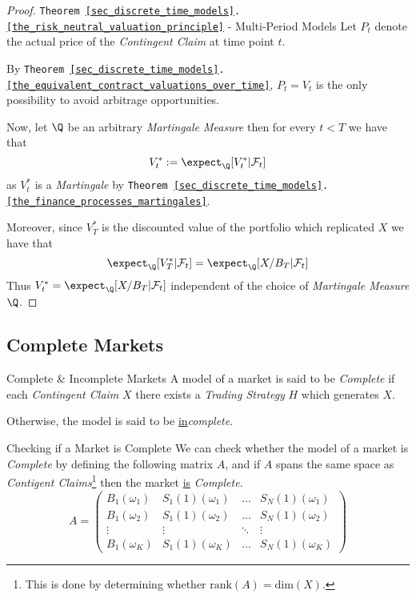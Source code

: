 \documentclass[11pt,a4paper]{article}
\begin{document}
  \begin{proof}{\texttt{Theorem \ref{sec_discrete_time_models}.\ref{the_risk_neutral_valuation_principle}} - Multi-Period Models}\label{prf_risk_neutral_valuation_principle_multi_period}
    Let $P_t$ denote the actual price of the \textit{Contingent Claim} at time point $t$.
    \par By \texttt{Theorem \ref{sec_discrete_time_models}.\ref{the_equivalent_contract_valuations_over_time}}, $P_t=V_t$ is the only possibility to avoid arbitrage opportunities.
    \par Now, let $\Q$ be an arbitrary \textit{Martingale Measure} then for every $t<T$ we have that
    \[ V_t^*:=\expect_\Q[V_t^*|\mathcal{F}_t] \]
    as $V_t^*$ is a \textit{Martingale} by \texttt{Theorem \ref{sec_discrete_time_models}.\ref{the_finance_processes_martingales}}.
    \par Moreover, since $V_T^*$ is the discounted value of the portfolio which replicated $X$ we have that
    \[ \expect_\Q[V_T^*|\mathcal{F}_t]=\expect_\Q[X/B_T|\mathcal{F}_t] \]
    Thus $V_t^*=\expect_\Q[X/B_T|\mathcal{F}_t]$ independent of the choice of \textit{Martingale Measure} $\Q$.\proved
  \end{proof}

\subsection{Complete Markets}

  \begin{definition}{Complete \& Incomplete Markets}
    A model of a market is said to be \textit{Complete} if each \textit{Contingent Claim} $X$ there exists a \textit{Trading Strategy} $H$ which generates $X$.
    \par Otherwise, the model is said to be \underline{in}\textit{complete}.
  \end{definition}

  \begin{remark}{Checking if a Market is Complete}
    We can check whether the model of a market is \textit{Complete} by defining the following matrix $A$, and if $A$ spans the same space as \textit{Contigent Claims}\footnote{This is done by determining whether $\text{rank}(A)=\text{dim}(X)$.} then the market \underline{is} \textit{Complete}.
    \[ A=\begin{pmatrix}
        B_1(\omega_1)&S_1(1)(\omega_1)&\dots&S_N(1)(\omega_1)\\
        B_1(\omega_2)&S_1(1)(\omega_2)&\dots&S_N(1)(\omega_2)\\
        \vdots&\vdots&\ddots&\vdots\\
        B_1(\omega_K)&S_1(1)(\omega_K)&\dots&S_N(1)(\omega_K)
    \end{pmatrix} \]
  \end{remark}
\end{document}
